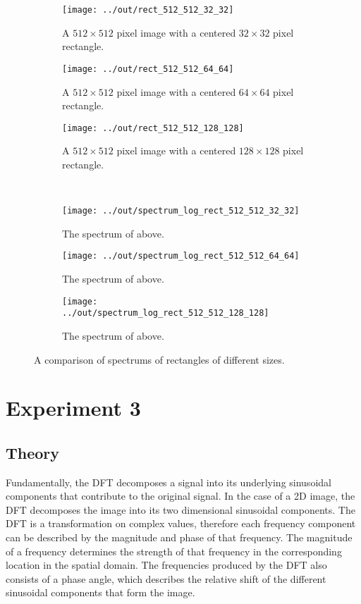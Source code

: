 \documentclass[headings=optiontoheadandtoc,listof=totoc,parskip=full]{scrartcl}
\begin{document}
\begin{figure}[H]
	\centering
	\begin{subfigure}[t]{.3\textwidth}
		\centering
		\texttt{[image: ../out/rect\_512\_512\_32\_32]}
		\caption{A $512 \times 512$ pixel image with a centered $32 \times 32$ pixel rectangle.}
	\end{subfigure}
	\quad
	\begin{subfigure}[t]{.3\textwidth}
		\centering
		\texttt{[image: ../out/rect\_512\_512\_64\_64]}
		\caption{A $512 \times 512$ pixel image with a centered $64 \times 64$ pixel rectangle.}
	\end{subfigure}
	\quad
	\begin{subfigure}[t]{.3\textwidth}
		\centering
		\texttt{[image: ../out/rect\_512\_512\_128\_128]}
		\caption{A $512 \times 512$ pixel image with a centered $128 \times 128$ pixel rectangle.}
	\end{subfigure}
	\\
	\begin{subfigure}[t]{.3\textwidth}
		\centering
		\texttt{[image: ../out/spectrum\_log\_rect\_512\_512\_32\_32]}
		\caption{The spectrum of above.}
	\end{subfigure}
	\quad
	\begin{subfigure}[t]{.3\textwidth}
		\centering
		\texttt{[image: ../out/spectrum\_log\_rect\_512\_512\_64\_64]}
		\caption{The spectrum of above.}
	\end{subfigure}
	\quad
	\begin{subfigure}[t]{.3\textwidth}
		\centering
		\texttt{[image: ../out/spectrum\_log\_rect\_512\_512\_128\_128]}
		\caption{The spectrum of above.}
	\end{subfigure}
	\caption{A comparison of spectrums of rectangles of different sizes.}
	\label{fig:rectangle-spectrum-comparison}
\end{figure}

\section{Experiment 3}
\label{sec:exp-3}


\subsection{Theory}

Fundamentally, the DFT decomposes a signal into its underlying sinusoidal components that contribute to the original signal. In the case of a 2D image, the DFT decomposes the image into its two dimensional sinusoidal components. The DFT is a transformation on complex values, therefore each frequency component can be described by the magnitude and phase of that frequency. The magnitude of a frequency determines the strength of that frequency in the corresponding location in the spatial domain. The frequencies produced by the DFT also consists of a phase angle, which describes the relative shift of the different sinusoidal components that form the image.
\end{document}
